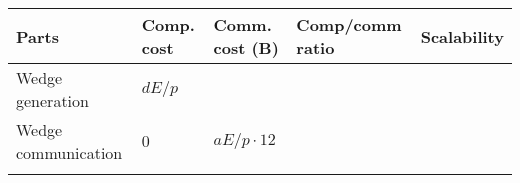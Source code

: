 \documentclass[10pt,oneside]{memoir}
\begin{document}
\begin{longtable}[]{@{}lllll@{}}
\toprule
\begin{minipage}[b]{0.23\columnwidth}\raggedright
Parts\strut
\end{minipage} & \begin{minipage}[b]{0.12\columnwidth}\raggedright
Comp. cost\strut
\end{minipage} & \begin{minipage}[b]{0.15\columnwidth}\raggedright
Comm. cost (B)\strut
\end{minipage} & \begin{minipage}[b]{0.22\columnwidth}\raggedright
Comp/comm ratio\strut
\end{minipage} & \begin{minipage}[b]{0.13\columnwidth}\raggedright
Scalability\strut
\end{minipage}\tabularnewline
\midrule
\endhead
\begin{minipage}[t]{0.23\columnwidth}\raggedright
Wedge generation\strut
\end{minipage} & \begin{minipage}[t]{0.12\columnwidth}\raggedright
\(dE/p\)\strut
\end{minipage} & \begin{minipage}[t]{0.15\columnwidth}\raggedright
\strut
\end{minipage} & \begin{minipage}[t]{0.22\columnwidth}\raggedright
\strut
\end{minipage} & \begin{minipage}[t]{0.13\columnwidth}\raggedright
\strut
\end{minipage}\tabularnewline
\begin{minipage}[t]{0.23\columnwidth}\raggedright
Wedge communication\strut
\end{minipage} & \begin{minipage}[t]{0.12\columnwidth}\raggedright
\(0\)\strut
\end{minipage} & \begin{minipage}[t]{0.15\columnwidth}\raggedright
\(aE/p \cdot 12\)\strut
\end{minipage} & \begin{minipage}[t]{0.22\columnwidth}\raggedright
\strut
\end{minipage} & \begin{minipage}[t]{0.13\columnwidth}\raggedright
\strut
\end{minipage}\tabularnewline
\begin{minipage}[t]{0.23\columnwidth}\raggedright

\end{minipage}
\end{longtable}
\end{document}
